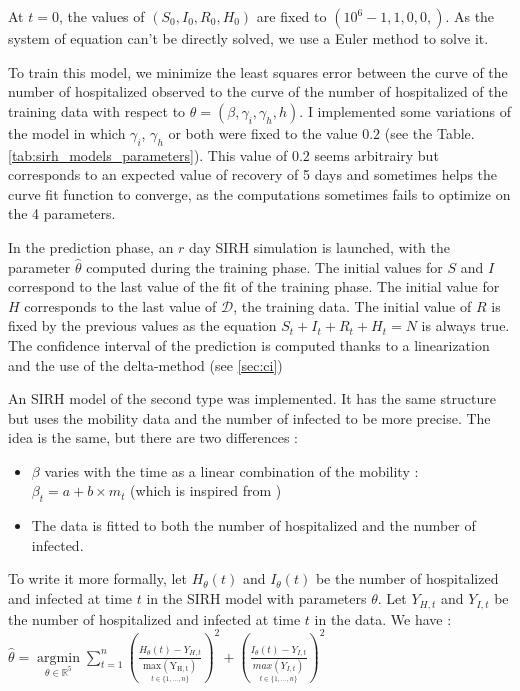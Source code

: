 At $t=0$, the values of $(S_0, I_0, R_0, H_0)$ are fixed to $(10^6 -1, 1, 0, 0,) $. 
As the system of equation can't be directly solved, we use a Euler method to solve it. 


To train this model, we minimize the least squares error between the curve of the number of hospitalized observed to the curve of the number of hospitalized of the training data with respect to $\theta = (\beta, \gamma_i, \gamma_h, h)$. 
I implemented some variations of the model in which $\gamma_i$, $\gamma_h$ or both were fixed to the value $0.2$ (see the Table.\ref{tab:sirh_models_parameters}).
This value of $0.2$ seems arbitrairy but corresponds to an expected value of recovery of 5 days and sometimes helps the curve fit function to converge, as the computations sometimes fails to optimize on the 4 parameters. 


In the prediction phase, an $r$ day SIRH simulation is launched, with the parameter $\hat{\theta}$ computed during the training phase. 
The initial values for $S$ and $I$ correspond to the last value of the fit of the training phase. 
The initial value for $H$ corresponds to the last value of $\mathcal{D}$, the training data. 
The initial value of $R$ is fixed by the previous values as the equation $S_t + I_t + R_t + H_t = N$ is always true. 
The confidence interval of the prediction is computed thanks to a linearization and the use of the delta-method (see \ref{sec:ci})

An SIRH model of the second type was implemented. 
It has the same structure but uses the mobility data and the number of infected to be more precise. 
The idea is the same, but there are two differences : 
\begin{itemize}
    \item $\beta$ varies with the time as a linear combination of the mobility : $\beta_t = a + b \times m_t$ (which is inspired from \cite{gerlee2021predicting})
    \item The data is fitted to both the number of hospitalized and the number of infected. 
\end{itemize}
To write it more formally, let $H_\theta(t)$ and $I_\theta(t)$ be the number of hospitalized and infected at time $t$ in the SIRH model with parameters $\theta$.
Let $Y_{H, t}$ and $Y_{I, t}$ be the number of hospitalized and infected at time $t$ in the data.
We have :\\

$\hat{\theta} = \underset{\theta \in \mathbb{R}^5}{\operatorname{argmin}} \sum_{t=1}^{n} (\frac{H_\theta(t) - Y_{H, t}}{\underset{t \in \{1, ..., n \}}{\operatorname{max(Y_{H, t})}}})^2 + (\frac{I_\theta(t) - Y_{I, t}}{\underset{t \in \{1, ..., n \}}{max(Y_{I, t})}})^2$\\

